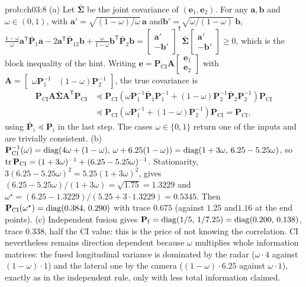 \begin{sol}{prob:ch03:8}
(a) Let $\bar{\boldsymbol{\Sigma}}$ be the joint covariance of $(\mathbf{e}_1,\mathbf{e}_2)$. For any $\mathbf{a},\mathbf{b}$ and\allowbreak $\omega\in(0,1)$, with $\mathbf{a}'=\sqrt{(1-\omega)/\omega}\,\mathbf{a}$ and\allowbreak $\mathbf{b}'=\sqrt{\omega/(1-\omega)}\,\mathbf{b}$,
$\tfrac{1-\omega}{\omega}\mathbf{a}^{\mathsf T}\bar{\mathbf{P}}_1\mathbf{a}-2\mathbf{a}^{\mathsf T}\bar{\mathbf{P}}_{12}\mathbf{b}+\tfrac{\omega}{1-\omega}\mathbf{b}^{\mathsf T}\bar{\mathbf{P}}_2\mathbf{b}=\begin{bmatrix}\mathbf{a}'\\-\mathbf{b}'\end{bmatrix}^{\mathsf T}\bar{\boldsymbol{\Sigma}}\begin{bmatrix}\mathbf{a}'\\-\mathbf{b}'\end{bmatrix}\ge0$,
which is the block inequality of the hint. Writing $\mathbf{e}=\mathbf{P}_{\mathrm{CI}}\mathbf{A}\begin{bmatrix}\mathbf{e}_1\\ \mathbf{e}_2\end{bmatrix}$ with $\mathbf{A}=\begin{bmatrix}\omega\mathbf{P}_1^{-1}&(1-\omega)\mathbf{P}_2^{-1}\end{bmatrix}$, the true covariance is
\begin{align*}
\mathbf{P}_{\mathrm{CI}}\mathbf{A}\bar{\boldsymbol{\Sigma}}\mathbf{A}^{\mathsf T}\mathbf{P}_{\mathrm{CI}}
&\preceq\mathbf{P}_{\mathrm{CI}}\left(\omega\mathbf{P}_1^{-1}\bar{\mathbf{P}}_1\mathbf{P}_1^{-1}+(1-\omega)\mathbf{P}_2^{-1}\bar{\mathbf{P}}_2\mathbf{P}_2^{-1}\right)\mathbf{P}_{\mathrm{CI}}\\
&\preceq\mathbf{P}_{\mathrm{CI}}\left(\omega\mathbf{P}_1^{-1}+(1-\omega)\mathbf{P}_2^{-1}\right)\mathbf{P}_{\mathrm{CI}}=\mathbf{P}_{\mathrm{CI}},
\end{align*}
using $\bar{\mathbf{P}}_i\preceq\mathbf{P}_i$ in the last step. The cases $\omega\in\{0,1\}$ return one of the inputs and are trivially consistent.
(b) $\mathbf{P}_{\mathrm{CI}}^{-1}(\omega)=\operatorname{diag}(4\omega+(1-\omega),\,\omega+6.25(1-\omega))=\operatorname{diag}(1+3\omega,\,6.25-5.25\omega)$, so $\operatorname{tr}\mathbf{P}_{\mathrm{CI}}=(1+3\omega)^{-1}+(6.25-5.25\omega)^{-1}$. Stationarity, $3(6.25-5.25\omega)^{2}=5.25(1+3\omega)^{2}$, gives $(6.25-5.25\omega)/(1+3\omega)=\sqrt{1.75}=1.3229$ and\allowbreak $\omega^{\star}=(6.25-1.3229)/(5.25+3\cdot1.3229)=0.5345$. Then $\mathbf{P}_{\mathrm{CI}}(\omega^{\star})=\operatorname{diag}(0.384,\,0.290)$ with trace $0.675$ (against $1.25$ and\allowbreak $1.16$ at the end points).
(c) Independent fusion gives $\mathbf{P}_{\mathrm{f}}=\operatorname{diag}(1/5,\,1/7.25)=\operatorname{diag}(0.200,\,0.138)$, trace $0.338$, half the CI value: this is the price of not knowing the correlation. CI nevertheless remains direction dependent because $\omega$ multiplies whole information matrices: the fused longitudinal variance is dominated by the radar ($\omega\cdot4$ against $(1-\omega)\cdot1$) and the lateral one by the camera ($(1-\omega)\cdot6.25$ against $\omega\cdot1$), exactly as in the independent rule, only with less total information claimed.
\end{sol}

